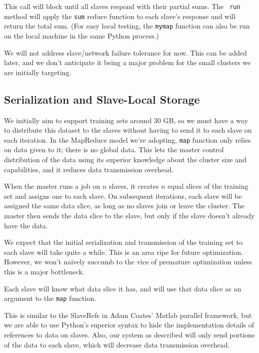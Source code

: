\documentclass[%
        final,
        notitlepage,
        narroweqnarray,
        inline,
        ]{ieee}
\begin{document}
This call will block until all slaves respond with their partial sums. The {\tt
  run} method will apply the {\tt sum} reduce function to each slave's response
and will return the total sum. (For easy local testing, the {\tt mymap}
function can also be run on the local machine in the same Python process.)

We will not address slave/network failure tolerance for now. This can be added
later, and we don't anticipate it being a major problem for the small clusters
we are initially targeting.

\subsection{Serialization and Slave-Local Storage}

We initially aim to support training sets around 30 GB, so we must have a way
to distribute this dataset to the slaves without having to send it to each slave on
each iteration. In the MapReduce model we're adopting, {\tt map} function only
relies on data given to it; there is no global data. This lets the master
control distribution of the data using its superior knowledge about the cluster
size and capabilities, and it reduces data transmission overhead.

When the master runs a job on $n$ slaves, it creates $n$ equal slices of the
training set and assigns one to each slave. On subsequent iterations, each
slave will be assigned the same data slice, as long as no slaves join or leave
the cluster. The master then sends the data slice to the slave, but only if the
slave doesn't already have the data.

We expect that the initial serialization and transmission of the training set
to each slave will take quite a while. This is an area ripe for future
optimization. However, we won't naively succumb to the vice of premature
optimization unless this is a major bottleneck.

Each slave will know what data slice it has, and will use that data slice as an
argument to the {\tt map} function.

This is similar to the SlaveRefs in Adam Coates' Matlab parallel framework, but
we are able to use Python's superior syntax to hide the implementation details
of references to data on slaves. Also, our system as described will only send
portions of the data to each slave, which will decrease data transmission
overhead.

%
%
\end{document}
